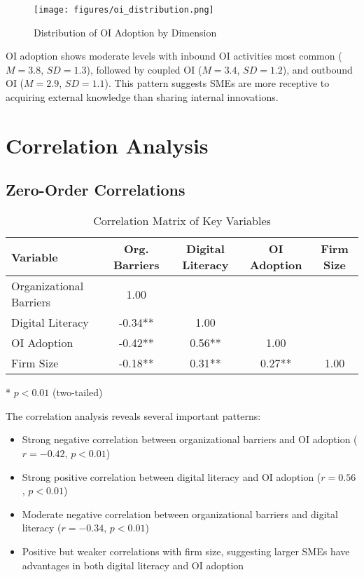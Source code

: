 \begin{figure}[H]
\centering
\texttt{[image: figures/oi\_distribution.png]}
\caption{Distribution of OI Adoption by Dimension}
\label{fig:oi_distribution}
\end{figure}

OI adoption shows moderate levels with inbound OI activities most common ($M = 3.8$, $SD = 1.3$), followed by coupled OI ($M = 3.4$, $SD = 1.2$), and outbound OI ($M = 2.9$, $SD = 1.1$). This pattern suggests SMEs are more receptive to acquiring external knowledge than sharing internal innovations.

\section{Correlation Analysis}

\subsection{Zero-Order Correlations}

\begin{table}[H]
\centering
\caption{Correlation Matrix of Key Variables}
\label{tab:correlation_matrix}
\begin{tabular}{@{}lcccc@{}}
\toprule
\textbf{Variable} & \textbf{Org. Barriers} & \textbf{Digital Literacy} & \textbf{OI Adoption} & \textbf{Firm Size} \\
\midrule
Organizational Barriers & 1.00 & & & \\
Digital Literacy & -0.34** & 1.00 & & \\
OI Adoption & -0.42** & 0.56** & 1.00 & \\
Firm Size & -0.18** & 0.31** & 0.27** & 1.00 \\
\bottomrule
\end{tabular}
\begin{tablenotes}
\item ** $p < 0.01$ (two-tailed)
\end{tablenotes}
\end{table}

The correlation analysis reveals several important patterns:
\begin{itemize}
    \item Strong negative correlation between organizational barriers and OI adoption ($r = -0.42$, $p < 0.01$)
    \item Strong positive correlation between digital literacy and OI adoption ($r = 0.56$, $p < 0.01$)
    \item Moderate negative correlation between organizational barriers and digital literacy ($r = -0.34$, $p < 0.01$)
    \item Positive but weaker correlations with firm size, suggesting larger SMEs have advantages in both digital literacy and OI adoption
\end{itemize}

